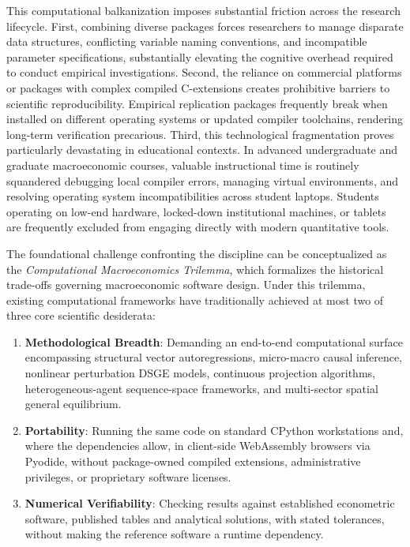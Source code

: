 \documentclass[11pt,letterpaper]{article}
\providecommand{\tightlist}{\setlength{\itemsep}{0pt}\setlength{\parskip}{0pt}}
\renewcommand{\_}{\pmunderscore\allowbreak}
\begin{document}
This computational balkanization imposes substantial friction across the research lifecycle. First, combining diverse packages forces researchers to manage disparate data structures, conflicting variable naming conventions, and incompatible parameter specifications, substantially elevating the cognitive overhead required to conduct empirical investigations. Second, the reliance on commercial platforms or packages with complex compiled C-extensions creates prohibitive barriers to scientific reproducibility. Empirical replication packages frequently break when installed on different operating systems or updated compiler toolchains, rendering long-term verification precarious. Third, this technological fragmentation proves particularly devastating in educational contexts. In advanced undergraduate and graduate macroeconomic courses, valuable instructional time is routinely squandered debugging local compiler errors, managing virtual environments, and resolving operating system incompatibilities across student laptops. Students operating on low-end hardware, locked-down institutional machines, or tablets are frequently excluded from engaging directly with modern quantitative tools.

The foundational challenge confronting the discipline can be conceptualized as the \emph{Computational Macroeconomics Trilemma}, which formalizes the historical trade-offs governing macroeconomic software design. Under this trilemma, existing computational frameworks have traditionally achieved at most two of three core scientific desiderata:

\begin{enumerate}
\def\labelenumi{\arabic{enumi}.}
\tightlist
\item
  \textbf{Methodological Breadth}: Demanding an end-to-end computational surface encompassing structural vector autoregressions, micro-macro causal inference, nonlinear perturbation DSGE models, continuous projection algorithms, heterogeneous-agent sequence-space frameworks, and multi-sector spatial general equilibrium.
\item
  \textbf{Portability}: Running the same code on standard CPython workstations and, where the dependencies allow, in client-side WebAssembly browsers via Pyodide, without package-owned compiled extensions, administrative privileges, or proprietary software licenses.
\item
  \textbf{Numerical Verifiability}: Checking results against established econometric software, published tables and analytical solutions, with stated tolerances, without making the reference software a runtime dependency.
\end{enumerate}
\end{document}
